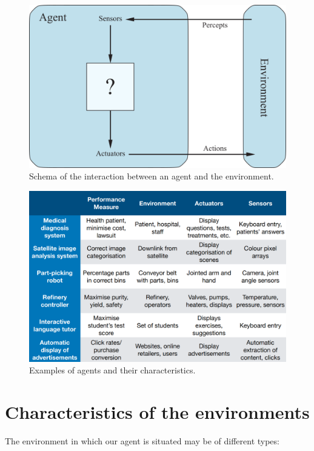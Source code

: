 \begin{figure}[hbtp]
    \centering
    \includegraphics{Images/Chapter 1/agent-environment-schema.png}
    \caption{Schema of the interaction between an agent and the environment.}
    \label{fig:ch1-agentenvironmentschema}
\end{figure}
\begin{figure}[hbtp]
    \centering
    \includegraphics[width=\textwidth]{Images/Chapter 1/agents-type.png}
    \caption{Examples of agents and their characteristics.}
    \label{fig:ch1-agentexamples}
\end{figure}

\section{Characteristics of the environments}
The environment in which our agent is situated may be of different types:

